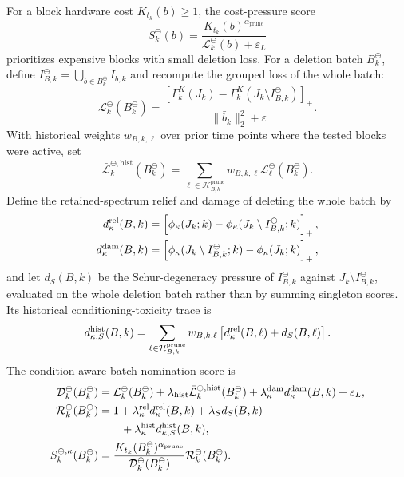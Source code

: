 \documentclass[
  reprint,
  amsmath,
  amssymb,
  aps,
  pra,
  nofootinbib,
  superscriptaddress,
  floatfix
]{revtex4-2}
\newcommand{\prune}{\mathrm{prune}}
\newcommand{\eps}{\varepsilon}
\begin{document}
For a block hardware cost \(K_{t_k}(b)\ge1\), the cost-pressure score
\begin{equation*}
S_k^{\ominus}(b)
=
\frac{K_{t_k}(b)^{\alpha_{\prune}}}
{\mathcal L_k^{\ominus}(b)+\eps_L}
\end{equation*}
prioritizes expensive blocks with small deletion loss.  For a deletion batch $B_k^{\ominus}$, define $I_{B,k}^{\ominus}=\bigcup_{b\in B_k^{\ominus}}I_{b,k}$ and recompute the grouped loss of the whole batch:
\begin{equation}
\mathcal L_k^{\ominus}(B_k^{\ominus})
=
\frac{
\left[
\Gamma_k^{K}(J_k)
-
\Gamma_k^{K}(J_k\setminus I_{B,k}^{\ominus})
\right]_+
}{
\|\bar b_k\|_2^2+\eps
}.
\label{eq:prune_batch_full_loss_main}
\end{equation}
With historical weights $w_{B,k,\ell}$ over prior time points where the tested blocks were active, set
\begin{equation}
\bar{\mathcal L}_k^{\ominus,\mathrm{hist}}(B_k^{\ominus})
=
\sum_{\ell\in\mathcal H_{B,k}^{\prune}}
w_{B,k,\ell}\mathcal L_{\ell}^{\ominus}(B_k^{\ominus}).
\label{eq:prune_batch_history_loss_main}
\end{equation}
Define the retained-spectrum relief and damage of deleting the whole batch by
\begin{equation*}
\begin{aligned}
d_{\kappa}^{\rm rel}(B,k)
&=
\left[\phi_{\kappa}(J_k;k)-\phi_{\kappa}(J_k\setminus I_{B,k}^{\ominus};k)\right]_+,
\\
d_{\kappa}^{\rm dam}(B,k)
&=
\left[\phi_{\kappa}(J_k\setminus I_{B,k}^{\ominus};k)-\phi_{\kappa}(J_k;k)\right]_+,
\end{aligned}
\end{equation*}
and let \(d_S(B,k)\) be the Schur-degeneracy pressure of \(I_{B,k}^{\ominus}\) against \(J_k\setminus I_{B,k}^{\ominus}\), evaluated on the whole deletion batch rather than by summing singleton scores.  Its historical conditioning-toxicity trace is
\begin{equation}
d_{\kappa,S}^{\rm hist}(B,k)
=
\sum_{\ell\in\mathcal H_{B,k}^{\prune}}
w_{B,k,\ell}
\left[
d_{\kappa}^{\rm rel}(B,\ell)+d_S(B,\ell)
\right].
\label{eq:prune_conditioning_history_main}
\end{equation}
The condition-aware batch nomination score is
\begingroup
\small
\begin{equation*}
\begin{aligned}
\mathcal D_k^{\ominus}(B_k^{\ominus})
&=
\mathcal L_k^{\ominus}(B_k^{\ominus})
+\lambda_{\rm hist}\bar{\mathcal L}_k^{\ominus,\mathrm{hist}}(B_k^{\ominus})
+\lambda_{\kappa}^{\rm dam}d_{\kappa}^{\rm dam}(B,k)
+\eps_L,
\\
\mathcal R_k^{\ominus}(B_k^{\ominus})
&=
1+\lambda_{\kappa}^{\rm rel}d_{\kappa}^{\rm rel}(B,k)
+\lambda_S d_S(B,k)\\
&\qquad
+\lambda_{\kappa}^{\rm hist}d_{\kappa,S}^{\rm hist}(B,k)
,
\\
S_k^{\ominus,\kappa}(B_k^{\ominus})
&=
\frac{K_{t_k}(B_k^{\ominus})^{\alpha_{\prune}}}
{\mathcal D_k^{\ominus}(B_k^{\ominus})}
\mathcal R_k^{\ominus}(B_k^{\ominus}).
\end{aligned}
\end{equation*}
\end{document}
